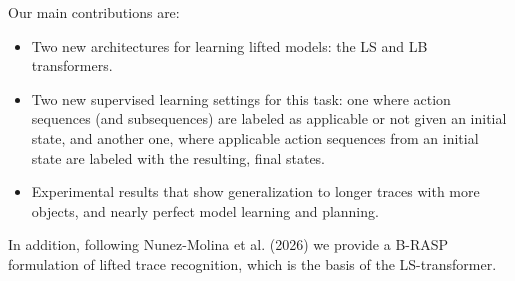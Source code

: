 {Our main contributions are:


\begin{itemize}
\item Two new  architectures for learning lifted \strips models:  the LS and LB transformers.
\item Two new supervised learning settings for this task:  one where action sequences (and subsequences) are labeled as applicable or not given an initial state,
and another one, where applicable action sequences from an initial state are labeled with the resulting, final states.
\item Experimental results that show generalization to longer traces with more objects, and nearly perfect model learning and planning.
\end{itemize}

In addition, following Nunez-Molina et al. (2026) we provide a B-RASP formulation of lifted \strips trace recognition, which is the basis of the LS-transformer.
}

